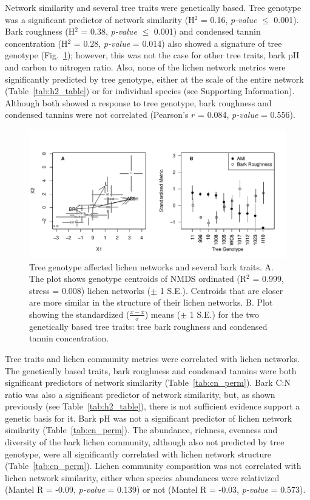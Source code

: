 \documentclass[11pt,twocolumn,twoside,lineno]{pnas-new}
\begin{document}

Network similarity and several tree traits were genetically
based. Tree genotype was a significant predictor of network similarity
(H$^2$ = 0.16, \textit{p-value} $\leq$ 0.001). Bark roughness (H$^2$ =
0.38, \textit{p-value} $\leq$ 0.001) and condensed tannin
concentration (H$^2$ = 0.28, \textit{p-value} = 0.014) also showed a
signature of tree genotype (Fig.~\ref{fig:h2_plot}); however, this was
not the case for other tree traits, bark pH and carbon to nitrogen
ratio. Also, none of the lichen network metrics were significantly
predicted by tree genotype, either at the scale of the entire network
(Table~\ref{tab:h2_table}) or for individual species (see Supporting
Information). Although both showed a response to tree genotype, bark
roughness and condensed tannins were not correlated (Pearson's $r$ =
0.084, \textit{p-value} = 0.556).



\begin{figure}[ht]
\centering
\includegraphics[width=\linewidth]{h2_plot.pdf}
\caption{Tree genotype affected lichen networks and several bark
  traits. A. The plot shows genotype centroids of NMDS ordinated
  (R$^2$ = 0.999, stress = 0.008) lichen networks ($\pm$ 1
  S.E.). Centroids that are closer are more similar in the structure
  of their lichen networks.  B. Plot showing the standardized
  ($\frac{x - \bar{x}}{\sigma}$) means ($\pm$ 1 S.E.) for the two
  genetically based tree traits: tree bark roughness and condensed
  tannin concentration.}
\label{fig:h2_plot}
\end{figure}

Tree traits and lichen community metrics were correlated with lichen
networks. The genetically based traits, bark roughness and condensed
tannins were both significant predictors of network similarity
(Table~\ref{tab:cn_perm}). Bark C:N ratio was also a significant
predictor of network similarity, but, as shown previously (see
Table~\ref{tab:h2_table}), there is not sufficient evidence support a
genetic basis for it. Bark pH was not a significant predictor of
lichen network similarity (Table~\ref{tab:cn_perm}). The abundance,
richness, evenness and diversity of the bark lichen community,
although also not predicted by tree genotype, were all significantly
correlated with lichen network structure
(Table~\ref{tab:cn_perm}). Lichen community composition was not
correlated with lichen network similarity, either when species
abundances were relativized (Mantel R = -0.09, \textit{p-value} =
0.139) or not (Mantel R = -0.03, \textit{p-value} = 0.573). 
\end{document}
